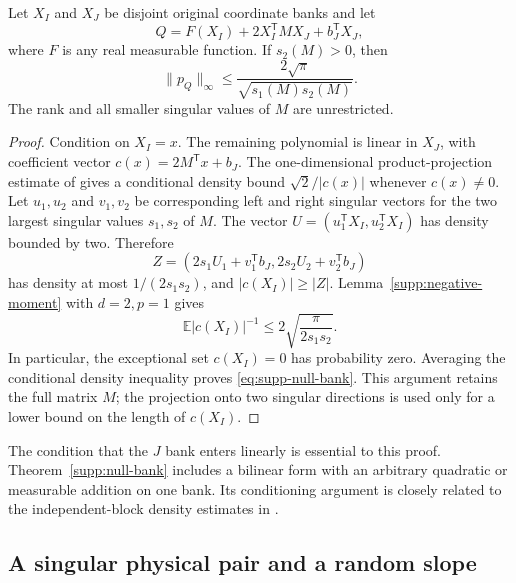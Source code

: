 \begin{theorem}
\label{supp:null-bank}
Let $X_I$ and $X_J$ be disjoint original coordinate banks and let
\[
 Q=F(X_I)+2X_I^{\mathsf T}M X_J+b_J^{\mathsf T}X_J,
\]
where $F$ is any real measurable function.  If $s_2(M)>0$, then
\begin{equation}\label{eq:supp-null-bank}
 \|p_Q\|_\infty\le
 \frac{2\sqrt\pi}{\sqrt{s_1(M)s_2(M)}}.
\end{equation}
The rank and all smaller singular values of $M$ are unrestricted.
\end{theorem}
\begin{proof}
Condition on $X_I=x$.  The remaining polynomial is linear in $X_J$,
with coefficient vector $c(x)=2M^{\mathsf T}x+b_J$.  The
one-dimensional product-projection estimate of \citet{LPP2016} gives
a conditional density bound $\sqrt2/|c(x)|$ whenever $c(x)\ne0$.
Let $u_1,u_2$ and $v_1,v_2$ be corresponding left and right singular
vectors for the two largest singular values $s_1,s_2$ of $M$.
The vector $U=(u_1^{\mathsf T}X_I,u_2^{\mathsf T}X_I)$ has density
bounded by two.  Therefore
\[
 Z=(2s_1U_1+v_1^{\mathsf T}b_J,
       2s_2U_2+v_2^{\mathsf T}b_J)
\]
has density at most $1/(2s_1s_2)$, and $|c(X_I)|\ge|Z|$.
Lemma~\ref{supp:negative-moment} with $d=2,p=1$ gives
\[
 \mathbb E|c(X_I)|^{-1}
 \le2\sqrt{\frac\pi{2s_1s_2}}.
\]
In particular, the exceptional set $c(X_I)=0$ has probability zero.
Averaging the conditional density inequality proves
\eqref{eq:supp-null-bank}.  This argument retains the full matrix $M$;
the projection onto two singular directions is used only for a lower
bound on the length of $c(X_I)$.
\end{proof}

The condition that the $J$ bank enters linearly is essential to this
proof.  Theorem~\ref{supp:null-bank} includes a bilinear form with
an arbitrary quadratic or measurable addition on one bank.  Its
conditioning argument is closely related to the independent-block
density estimates in \citet{BGKS2024}.

\subsection{A singular physical pair and a random slope}

